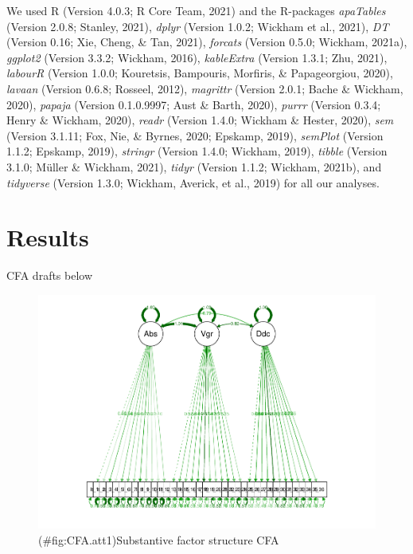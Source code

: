 \documentclass[
  english,
  man]{apa6}
\begin{document}
We used R (Version 4.0.3; R Core Team, 2021) and the R-packages \emph{apaTables} (Version 2.0.8; Stanley, 2021), \emph{dplyr} (Version 1.0.2; Wickham et al., 2021), \emph{DT} (Version 0.16; Xie, Cheng, \& Tan, 2021), \emph{forcats} (Version 0.5.0; Wickham, 2021a), \emph{ggplot2} (Version 3.3.2; Wickham, 2016), \emph{kableExtra} (Version 1.3.1; Zhu, 2021), \emph{labourR} (Version 1.0.0; Kouretsis, Bampouris, Morfiris, \& Papageorgiou, 2020), \emph{lavaan} (Version 0.6.8; Rosseel, 2012), \emph{magrittr} (Version 2.0.1; Bache \& Wickham, 2020), \emph{papaja} (Version 0.1.0.9997; Aust \& Barth, 2020), \emph{purrr} (Version 0.3.4; Henry \& Wickham, 2020), \emph{readr} (Version 1.4.0; Wickham \& Hester, 2020), \emph{sem} (Version 3.1.11; Fox, Nie, \& Byrnes, 2020; Epskamp, 2019), \emph{semPlot} (Version 1.1.2; Epskamp, 2019), \emph{stringr} (Version 1.4.0; Wickham, 2019), \emph{tibble} (Version 3.1.0; Müller \& Wickham, 2021), \emph{tidyr} (Version 1.1.2; Wickham, 2021b), and \emph{tidyverse} (Version 1.3.0; Wickham, Averick, et al., 2019) for all our analyses.

\hypertarget{results}{%
\section{Results}\label{results}}

CFA drafts below

\begin{figure}
\centering
\includegraphics{SIOPpapaja_files/figure-latex/CFA.att1-1.pdf}
\caption{(\#fig:CFA.att1)Substantive factor structure CFA}
\end{figure}
\end{document}

